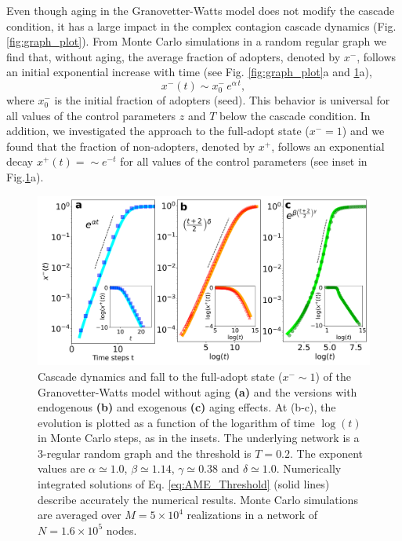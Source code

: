 Even though aging in the Granovetter-Watts model does not modify the cascade condition, it has a large impact in the complex contagion cascade dynamics (Fig.\ref{fig:graph_plot}). 
From Monte Carlo simulations in a random regular graph we find that, without aging,  the average fraction of adopters, denoted by $x^{-}$, follows an initial exponential increase with time (see Fig. \ref{fig:graph_plot}a and \ref{fig:models}a), 
\begin{equation}
x^{-}(t) \sim x^{-}_{0} \, e^{\alpha \, t},
\label{eq:exponential}
\end{equation}
where $x^{-}_{0}$ is the initial fraction of adopters (seed). This behavior is universal for all values of the control parameters $z$ and $T$ below the cascade condition. In addition, we investigated the approach to the full-adopt state ($x^{-} = 1$) and we found that the fraction of non-adopters, denoted by $x^{+}$, follows an exponential decay $x^{+}(t) = \sim e^{-t}$ for all values of the control parameters (see inset in Fig.\ref{fig:models}a).

\begin{figure}
\centering \captionsetup{font=sf}
\includegraphics[width=0.7\columnwidth]{Figs/Aging_Threshold/EVO_MOD.pdf}
\caption[Cascade dynamics and fall to the full-adopt state ($x^{-} \sim 1$)]{\label{fig:models} Cascade dynamics and fall to the full-adopt state ($x^{-} \sim 1$) of the Granovetter-Watts model without aging \textbf{(a)} and the versions with endogenous \textbf{(b)} and exogenous \textbf{(c)} aging effects. At (b-c), the evolution is plotted as a function of the logarithm of time $\log{(t)}$ in Monte Carlo steps, as in the insets. The underlying network is a 3-regular random graph and the threshold is $T = 0.2$. The exponent values are $\alpha \simeq 1.0$, $\beta \simeq 1.14$, $\gamma \simeq 0.38$ and $\delta \simeq 1.0$. Numerically integrated solutions of Eq. \eqref{eq:AME_Threshold} (solid lines) describe accurately the numerical results. Monte Carlo simulations are averaged over $M = 5 \times 10^4$ realizations in a network of $N = 1.6 \times 10^5$ nodes.}
\end{figure}

